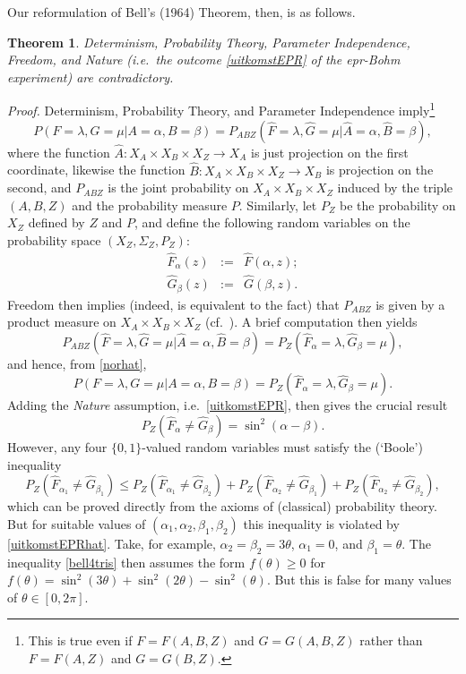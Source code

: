 \documentclass[12pt]{article}
\newtheorem{Theorem}[Definition]{Theorem}
\newcommand{\epr}{{\sc epr}}
\renewcommand{\L}{\label}
\newcommand{\beq}{\begin{equation}}
\newcommand{\eeq}{\end{equation}}
\newcommand{\raw}{\rightarrow} \newcommand{\rat}{\mapsto}
\newcommand{\x}{\times} \newcommand{\hb}{\hbar}
\newcommand{\er}{\eqref}
\newcommand{\al}{\alpha} \newcommand{\bt}{L\beta}
\newcommand{\lm}{\lambda} \newcommand{\Lm}{\Lambda}
\newcommand{\Sg}{\Sigma} \newcommand{\ta}{\tau} \newcommand{\ph}{\phi}
\renewcommand{\L}{\label}
\begin{document}
Our reformulation of Bell's (1964) Theorem, then, is as follows.
\begin{Theorem}\label{Bell1964}
Determinism, Probability Theory,  Parameter Independence, Freedom, and Nature (i.e.\ the outcome \er{uitkomstEPR} of the \epr-Bohm experiment) are contradictory.
\end{Theorem}
\emph{Proof.} Determinism, Probability Theory, and Parameter Independence imply\footnote{This is true even if $F=F(A,B,Z)$ and $G=G(A,B,Z)$ rather than $F=F(A,Z)$ and $G=G(B,Z)$.}
\begin{equation}
P(F=\lm,G=\mu|A=\al,B=\beta)=P_{ABZ}(\hat{F}=\lm,\hat{G}=\mu|\hat{A}=\al,\hat{B}=\beta),\label{norhat}
\end{equation}
where the function $\hat{A}:X_A \x X_B\x X_Z\raw X_A$ is just projection on the first coordinate, likewise the function $\hat{B}: X_A \x X_B\x X_Z\raw X_B$ is  projection on the second, and 
 $P_{ABZ}$ is the joint probability on $X_A \x X_B\x X_Z$ induced by the triple $(A,B,Z)$ and the probability measure $P$.
 Similarly, let $P_Z$ be the probability on $X_Z$ defined by $Z$ and $P$, and 
  define the following random variables on the probability space $(X_Z,\Sg_Z,P_Z)$:
\begin{eqnarray}
\hat{F}_{\al}(z)&:=& \hat{F}(\al,z);\label{hatFalbeta}\\
\hat{G}_{\beta}(z)&:=& \hat{G}(\beta,z).\label{hatGalbeta}
\end{eqnarray}
 Freedom then implies (indeed, is equivalent to the fact) that  $P_{ABZ}$ is given by a product measure on  $X_A \x X_B\x X_Z$ (cf.\ \cite[Lemma 3.10]{Kallenberg}). A brief computation then yields
  \begin{equation}
P_{ABZ}(\hat{F}=\lm,\hat{G}=\mu|\hat{A}=\al,\hat{B}=\beta)=P_Z(\hat{F}_{\al}=\lm,\hat{G}_{\beta}=\mu),
\end{equation}
and hence, from \er{norhat}, 
 \begin{equation}
 P(F=\lm,G=\mu|A=\al,B=\beta)=P_Z(\hat{F}_{\al}=\lm,\hat{G}_{\beta}=\mu).\label{crux2bis}
\end{equation}
Adding the \emph{Nature} assumption, i.e.\ \er{uitkomstEPR},  then gives the crucial result
\begin{equation}
P_Z(\hat{F}_{\al}\neq \hat{G}_{\beta})=\sin^2(\al-\beta).\label{uitkomstEPRhat}
\end{equation}
However, any four $\{0,1\}$-valued random variables must satisfy the (`Boole') inequality \cite{Pitowsky}
\beq P_Z(\hat{F}_{\al_1}\neq \hat{G}_{\beta_1})\leq P_Z(\hat{F}_{\al_1}\neq \hat{G}_{\beta_2})+P_Z(\hat{F}_{\al_2}\neq \hat{G}_{\beta_1})+P_Z(\hat{F}_{\al_2}\neq \hat{G}_{\beta_2}), \L{bell4tris} \eeq
which can be  proved directly from the axioms of (classical) probability theory. But for  suitable values of $(\al_1,\al_2,\beta_1,\beta_2)$ this inequality is violated by \er{uitkomstEPRhat}. Take, for example,  $\al_2=\beta_2=3\theta$, $\al_1=0$, and $\beta_1=\theta$. The inequality \er{bell4tris} then assumes the form $f(\theta)\geq 0$ for $f(\theta)=\sin^2(3\theta)+\sin^2(2\theta)-\sin^2(\theta)$. But this is false for many values of $\theta\in[0,2\pi]$.
 \enp
 
\end{document}
